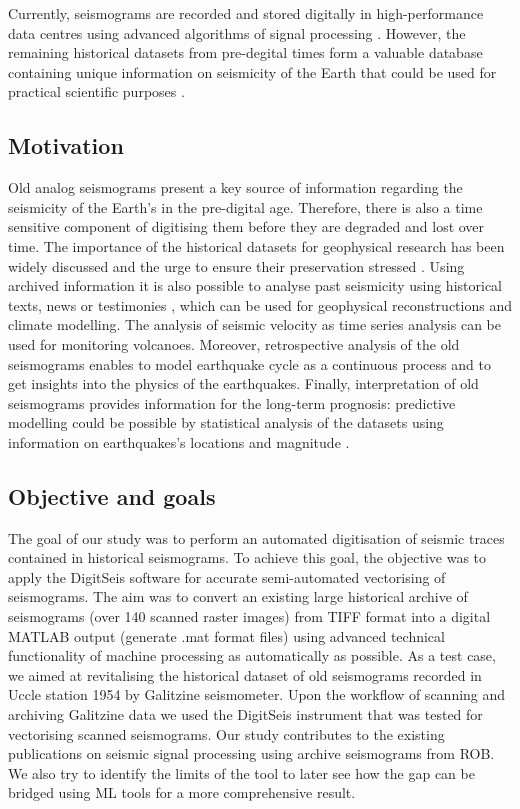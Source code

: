 \documentclass[informatics,article,submit,moreauthors,pdftex]{Definitions/mdpi}
\begin{document}
Currently, seismograms are recorded and stored digitally in high-performance data centres using advanced algorithms of signal processing \cite{Heiner}. However, the remaining historical datasets from pre-degital times form a valuable database containing unique information on seismicity of the Earth that could be used for practical scientific purposes \cite{Kanamorietal2010,Bungum,Kanamorietal2019,Lomnitz2004,Ambraseys1983}. 

\subsection{Motivation}
Old analog seismograms present a key source of information regarding the seismicity of the Earth's in the pre-digital age. Therefore, there is also a time sensitive component of digitising them before they are degraded and lost over time. The importance of the historical datasets for geophysical research has been widely discussed \cite{Vogtetal1985, TevesCosta1999,Bono2007,Okal} and the urge to ensure their preservation stressed \cite{Okal}. Using archived information it is also possible to analyse past seismicity using historical texts, news or testimonies \cite{Alexandre1990a,Alexandre1985,Alexandre1990b}, which can be used for geophysical reconstructions and climate modelling. The analysis of seismic velocity as time series analysis can be used for monitoring volcanoes. Moreover, retrospective analysis of the old seismograms enables to model earthquake cycle as a continuous process and to get insights into the physics of the earthquakes. Finally, interpretation of old seismograms provides information for the long-term prognosis: predictive modelling could be possible by statistical analysis of the datasets using information on earthquakes's locations and magnitude \cite{Kanamori1988}.

\subsection{Objective and goals}
The goal of our study was to perform an automated digitisation of seismic traces contained in historical seismograms. To achieve this goal, the objective was to apply the DigitSeis software for accurate semi-automated vectorising of seismograms. The aim was to convert an existing large historical archive of seismograms (over 140 scanned raster images) from TIFF format into a digital MATLAB output (generate .mat format files) using advanced technical functionality of machine processing as automatically as possible. As a test case, we aimed at revitalising the historical dataset of old seismograms recorded in Uccle station 1954 by Galitzine seismometer. Upon the workflow of scanning and archiving Galitzine data we used the DigitSeis instrument that was  tested for vectorising scanned seismograms. Our study contributes to the existing publications on seismic signal processing using archive seismograms from \ac{ROB}. We also try to identify the limits of the tool to later see how the gap can be bridged using ML tools for a more comprehensive result.
\end{document}
